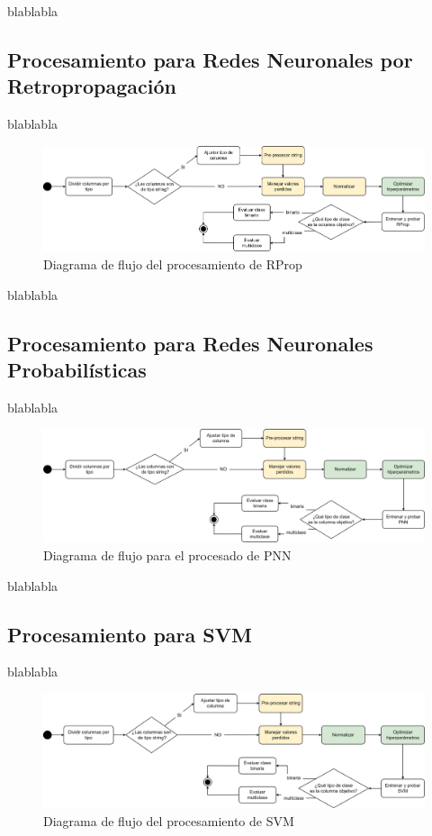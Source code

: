 blablabla

\subsection{Procesamiento para Redes Neuronales por Retropropagación}
blablabla

 \begin{figure}[H]
	\centering
	\includegraphics[width=1\linewidth]{"figuras/capi 2/modelos/procesado rprop.drawio"}
	\caption{Diagrama de flujo del procesamiento de RProp}
	\label{fig:procesado-rprop}
\end{figure}

blablabla


\subsection{Procesamiento para Redes Neuronales Probabilísticas}
blablabla
\begin{figure}[H]
	\centering
	\includegraphics[width=1\linewidth]{"figuras/capi 2/modelos/procesado pnn.drawio"}
	\caption{Diagrama de flujo para el procesado de PNN}
	\label{fig:procesado-pnn}
\end{figure}

blablabla


\subsection{Procesamiento para SVM}
blablabla
\begin{figure}[H]
	\centering
	\includegraphics[width=1\linewidth]{"figuras/capi 2/modelos/procesado svm.drawio"}
	\caption{Diagrama de flujo del procesamiento de SVM}
	\label{fig:procesado-svm}
\end{figure}

